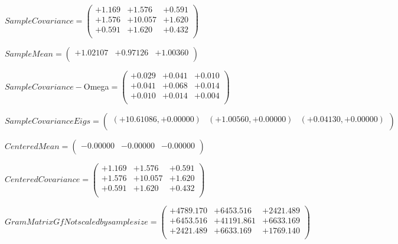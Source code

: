 \documentclass[9pt]{article}
\theoremstyle{plain}
\theoremstyle{definition}
\theoremstyle{remark}
\numberwithin{equation}{section}
\begin{document}
$Sample Covariance = \left(
\begin{array}{
ccc}
+1.169 & +1.576 & +0.591 \\
+1.576 & +10.057 & +1.620 \\
+0.591 & +1.620 & +0.432 \\
\end{array}
\right)$ \newline 

$Sample Mean = \left(
\begin{array}{
ccc}
+1.02107 & +0.97126 & +1.00360 \\
\end{array}
\right)$ \newline 

$Sample Covariance-$Omega$ = \left(
\begin{array}{
ccc}
+0.029 & +0.041 & +0.010 \\
+0.041 & +0.068 & +0.014 \\
+0.010 & +0.014 & +0.004 \\
\end{array}
\right)$ \newline 

$Sample Covariance Eigs = \left(
\begin{array}{
ccc}
(+10.61086,+0.00000) & (+1.00560,+0.00000) & (+0.04130,+0.00000) \\
\end{array}
\right)$ \newline 

$Centered Mean = \left(
\begin{array}{
ccc}
-0.00000 & -0.00000 & -0.00000 \\
\end{array}
\right)$ \newline 

$Centered Covariance = \left(
\begin{array}{
ccc}
+1.169 & +1.576 & +0.591 \\
+1.576 & +10.057 & +1.620 \\
+0.591 & +1.620 & +0.432 \\
\end{array}
\right)$ \newline 

$Gram Matrix Gf Not scaled by sample size = \left(
\begin{array}{
ccc}
+4789.170 & +6453.516 & +2421.489 \\
+6453.516 & +41191.861 & +6633.169 \\
+2421.489 & +6633.169 & +1769.140 \\
\end{array}
\right)$ \newline 
\end{document}
